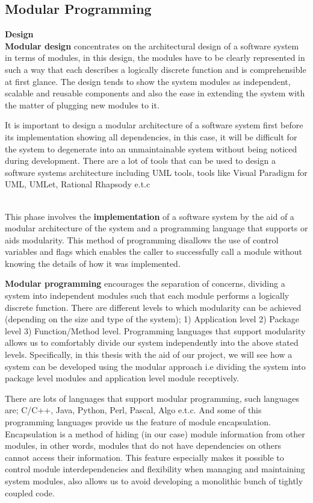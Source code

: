 \subsection{Modular Programming}
{\bf Design}\\
{\bf Modular design} concentrates on the architectural design of a software system in terms of modules, in this design, the modules have to be clearly represented in such a way that each describes a logically discrete function and is comprehensible at first glance. The design tends to show the system modules as independent, scalable and reusable components and also the ease in extending the system with the matter of plugging new modules to it. 

It is important to design a modular architecture of a software system first before its implementation showing all dependencies, in this case, it will be difficult for the system to degenerate into an unmaintainable system without being noticed during development. There are a lot of tools that can be used to design a software systems architecture including UML tools, tools like Visual Paradigm for UML, UMLet, Rational Rhapsody e.t.c

\\
This phase involves the {\bf implementation} of a software system by the aid of a modular architecture of the system and a programming language that supports or aids modularity. This method of programming disallows the use of control variables and flags which enables the caller to successfully call a module without knowing the details of how it was implemented. 

{\bf Modular programming} encourages the separation of concerns, dividing a system into independent modules such that each module performs a logically discrete function. There are different levels to which modularity can be achieved (depending on the size and type of the system); 1) Application level 2) Package level 3) Function/Method level. Programming languages that support modularity allows us to comfortably divide our system independently into the above stated levels. Specifically, in this thesis with the aid of our project, we will see how a system can be developed using the modular approach i.e dividing the system into package level modules and application level module receptively.

There are lots of languages that support modular programming, such languages are; C/C++, Java, Python, Perl, Pascal, Algo e.t.c.  And some of this programming languages provide us the feature of module encapsulation. Encapsulation is a method of hiding (in our case) module information from other modules, in other words, modules that do not have dependencies on others cannot access their information. This feature especially makes it possible to control module interdependencies and flexibility when managing and maintaining system modules, also allows us to avoid developing a monolithic bunch of tightly coupled code.


